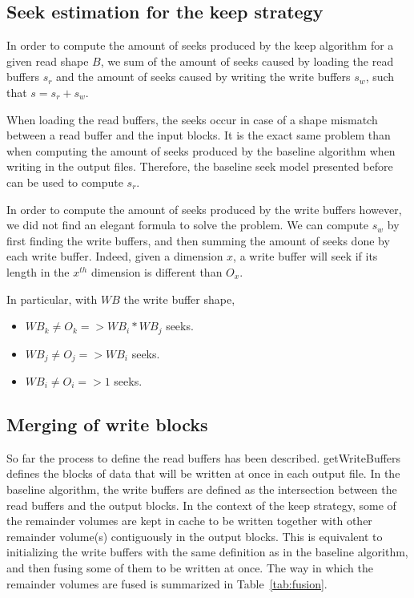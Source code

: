 \documentclass[sigconf, nonacm]{acmart}
\begin{document}
{\subsection{Seek estimation for the keep strategy}
In order to compute the amount of seeks produced by the keep algorithm
for a given read shape $B$, we sum of the amount of seeks caused by loading the
read buffers $s_r$ and the amount of seeks caused by writing the write
buffers $s_w$, such that $s=s_r+s_w$.

When loading the read buffers, the seeks occur in case of a shape mismatch
between a read buffer and the input blocks. It is the exact same problem than
when computing the amount of seeks produced by the baseline algorithm when
writing in the output files. Therefore, the baseline seek model presented
before can be used to compute $s_r$.

In order to compute the amount of seeks produced by the write buffers however,
we did not find an elegant formula to solve the problem. We can compute $s_w$
by first finding the write buffers, and then summing the amount of seeks done
by each write buffer. Indeed, given a dimension $x$, a write buffer will seek
if its length in the $x^{th}$ dimension is different than $O_x$.

In particular, with $WB$ the write buffer shape,
\begin{itemize}
  \item $WB_k \neq O_k => WB_i*WB_j$ seeks.
  \item $WB_j \neq O_j => WB_i$ seeks.
  \item $WB_i \neq O_i => 1$ seeks.
\end{itemize}

\subsection{Merging of write blocks}
So far the process to define the read buffers has been described.
getWriteBuffers defines the blocks of data that will be written at once in each
output file.
In the baseline algorithm, the write buffers are defined as the
intersection between the read buffers and the output blocks.
In the context of the keep strategy, some of the remainder volumes are kept in cache
to be written together with other remainder volume(s) contiguously in the output
blocks.
This is equivalent to initializing the write buffers with the same definition as
in the baseline algorithm, and then fusing some of them to be written at once.
The way in which the remainder volumes are fused is summarized in
Table~\ref{tab:fusion}.

}
\end{document}
